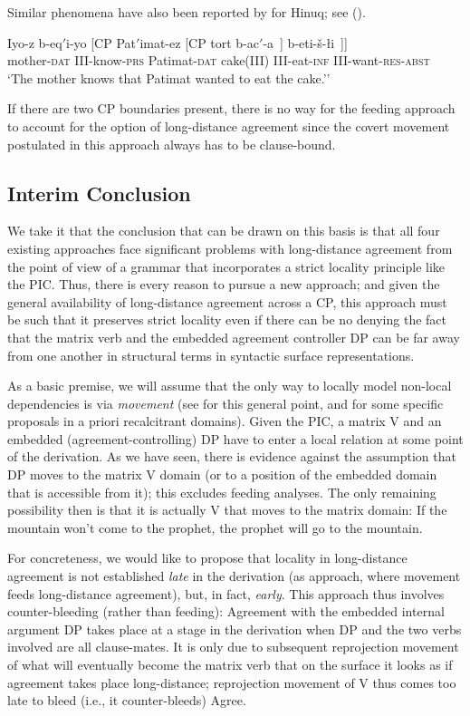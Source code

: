 \documentclass[output=paper
,modfonts
,nonflat]{langsci/langscibook}
\begin{document}
Similar phenomena have also been reported by \cite{Forker:11} for
Hinuq; see (\Next).

\ea \label{ex:mueller:22}\label{tsa2}
\gll Iyo-z b-eq$'$i-yo [CP Pat$'$imat-ez [CP tort  b-ac$'$-a~] b-eti-\v{s}-\l i~]]\\
mother-{\scshape dat} III-know-{\scshape prs} {} Patimat-{\scshape dat} {} cake(III) III-eat-{\scshape inf} III-want-{\scshape res}-{\scshape abst}\\
\glt `The mother knows that Patimat wanted to eat the cake.''
\z

If there are two CP boundaries present, there is no way for the feeding approach
to account for the option of long-distance agreement since the covert
movement postulated in this approach always has to be
clause-bound.

\subsection{Interim Conclusion}

We take it that the conclusion that can be drawn on this basis is that
all four existing approaches face significant problems with
long-distance agreement from the point of view of a grammar that
incorporates a strict locality principle like the PIC. Thus, there is
every reason to pursue a  new approach; and given the general
availability of long-distance agreement across a CP, this approach
must be such that it preserves strict locality even if there can be no
denying the fact that the matrix verb and the embedded agreement
controller DP can be far away from one another in structural terms in
syntactic surface representations. 

As a basic premise, we will assume that the only way to locally model
non-local dependencies is via {\itshape movement} (see
\cite{Hornstein:01,Hornstein:09} for this general point, and
\cite{Mueller:14:buf} for some specific proposals in a priori
recalcitrant domains). Given the PIC, a matrix V and an embedded
(agreement-controlling) DP have to enter a local relation at some
point of the derivation. As we have seen, there is evidence against
the assumption that DP moves to the matrix V domain (or to a position
of the embedded domain that is accessible from it); this excludes feeding
analyses. The only remaining possibility then is that it is actually
V that moves to the matrix domain: If the mountain won't come to the
prophet, the prophet will go to the mountain.

For concreteness, we would like to propose that locality in
long-distance agreement is not established {\itshape late} in the
derivation (as  approach, where
movement feeds long-distance agreement), but, in fact, {\it
  early}. This approach thus involves counter-bleeding (rather than
feeding): Agreement with the embedded internal argument DP takes place
at a stage in the derivation when DP and the two verbs involved are
all clause-mates. It is only due to subsequent reprojection movement
of what will eventually become the matrix verb 
 that on the surface it looks as if agreement takes place
long-distance; reprojection movement of V thus comes too late to bleed
(i.e., it counter-bleeds) Agree.
\end{document}
